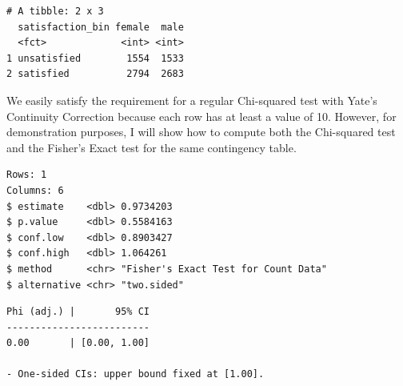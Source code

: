 \documentclass[
  letterpaper,
]{krantz}
\makeatletter
\newenvironment{Shaded}{\begin{snugshade}}{\end{snugshade}}
\newcommand{\AttributeTok}[1]{\textcolor[rgb]{0.40,0.45,0.13}{#1}}
\newcommand{\CommentTok}[1]{\textcolor[rgb]{0.37,0.37,0.37}{#1}}
\newcommand{\DocumentationTok}[1]{\textcolor[rgb]{0.37,0.37,0.37}{\textit{#1}}}
\newcommand{\FunctionTok}[1]{\textcolor[rgb]{0.28,0.35,0.67}{#1}}
\newcommand{\NormalTok}[1]{\textcolor[rgb]{0.00,0.23,0.31}{#1}}
\newcommand{\OtherTok}[1]{\textcolor[rgb]{0.00,0.23,0.31}{#1}}
\newcommand{\SpecialCharTok}[1]{\textcolor[rgb]{0.37,0.37,0.37}{#1}}
\newcommand{\StringTok}[1]{\textcolor[rgb]{0.13,0.47,0.30}{#1}}
\newenvironment{kframe}{%
\medskip{}
\setlength{\fboxsep}{.8em}
 \def\at@end@of@kframe{}%
 \ifinner\ifhmode%
  \def\at@end@of@kframe{\end{minipage}}%
  \begin{minipage}{\columnwidth}%
 \fi\fi%
 \def\FrameCommand##1{\hskip\@totalleftmargin \hskip-\fboxsep
 \colorbox{shadecolor}{##1}\hskip-\fboxsep
     \hskip-\linewidth \hskip-\@totalleftmargin \hskip\columnwidth}%
 \MakeFramed {\advance\hsize-\width
   \@totalleftmargin\z@ \linewidth\hsize
   \@setminipage}}%
 {\par\unskip\endMakeFramed%
 \at@end@of@kframe}
\renewenvironment{Shaded}{\begin{kframe}}{\end{kframe}}
\makeatother
\begin{document}
\begin{verbatim}
# A tibble: 2 x 3
  satisfaction_bin female  male
  <fct>             <int> <int>
1 unsatisfied        1554  1533
2 satisfied          2794  2683
\end{verbatim}

We easily satisfy the requirement for a regular Chi-squared test with
Yate's Continuity Correction because each row has at least a value of
10. However, for demonstration purposes, I will show how to compute both
the Chi-squared test and the Fisher's Exact test for the same
contingency table.

\begin{Shaded}
\end{Shaded}

\begin{verbatim}
Rows: 1
Columns: 6
$ estimate    <dbl> 0.9734203
$ p.value     <dbl> 0.5584163
$ conf.low    <dbl> 0.8903427
$ conf.high   <dbl> 1.064261
$ method      <chr> "Fisher's Exact Test for Count Data"
$ alternative <chr> "two.sided"
\end{verbatim}

\begin{Shaded}
\end{Shaded}

\begin{verbatim}
Phi (adj.) |       95% CI
-------------------------
0.00       | [0.00, 1.00]

- One-sided CIs: upper bound fixed at [1.00].
\end{verbatim}

\begin{Shaded}
\end{Shaded}
\end{document}
